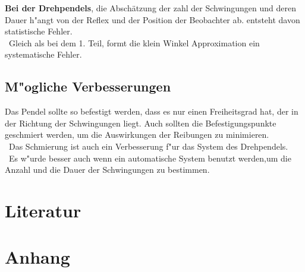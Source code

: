 \documentclass[11pt,a4paper]{article} %
\begin{document}
\textbf{Bei der Drehpendels}, die Abschätzung der zahl der Schwingungen und deren Dauer h"angt von der Reflex und der Position der Beobachter ab. entsteht davon statistische Fehler.
\\\
Gleich als bei dem 1. Teil, formt die klein Winkel Approximation ein systematische Fehler.
\subsection{ M"ogliche Verbesserungen}
Das Pendel sollte so befestigt werden, dass es nur einen Freiheitsgrad hat, der in der Richtung der Schwingungen liegt. Auch sollten die Befestigungspunkte geschmiert werden, um die Auswirkungen der Reibungen zu minimieren.
\\\
Das Schmierung ist auch ein Verbesserung f"ur das System des Drehpendels.
\\\
Es w"urde besser auch wenn ein automatische System benutzt werden,um die Anzahl und die Dauer der Schwingungen zu bestimmen.
\section{Literatur}

\section{Anhang}
\end{document}
